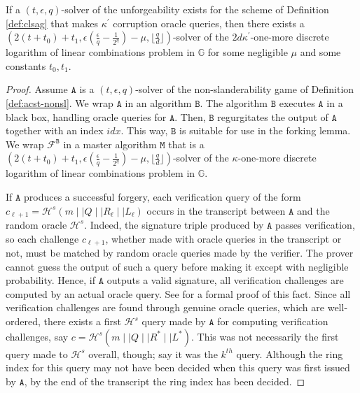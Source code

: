 \documentclass{llncs}
\begin{document}
\begin{theorem} \label{thm:nonsl}
If a $(t, \epsilon, q)$-solver of the unforgeability exists for the scheme of Definition \ref{def:clsag} that makes $\kappa^\prime$ corruption oracle queries, then there exists a $(2(t+t_0) + t_1, \epsilon\left(\frac{\epsilon}{q} - \frac{1}{2^\eta}\right) - \mu, \lfloor \frac{q}{d}\rfloor)$-solver of the $2d\kappa^\prime$-one-more discrete logarithm of linear combinations problem in $\mathbb{G}$ for some negligible $\mu$ and some constants $t_0, t_1$.
\end{theorem}

\begin{proof}
Assume $\texttt{A}$ is a $(t, \epsilon, q)$-solver of the non-slanderability game of Definition \ref{def:acst-nonsl}. We wrap $\texttt{A}$ in an algorithm $\texttt{B}$. The algorithm $\texttt{B}$ executes $\texttt{A}$ in a black box, handling oracle queries for $\texttt{A}$. Then, $\texttt{B}$ regurgitates the output of $\texttt{A}$ together with an index $idx$. This way, $\texttt{B}$ is suitable for use in the forking lemma. We wrap $\mathcal{F}^{\texttt{B}}$ in a master algorithm $\texttt{M}$ that is a $(2(t+t_0) + t_1, \epsilon\left(\frac{\epsilon}{q} - \frac{1}{2^\eta}\right) - \mu, \lfloor \frac{q}{d}\rfloor)$-solver of the $\kappa$-one-more discrete logarithm of linear combinations problem in $\mathbb{G}$.

If $\texttt{A}$ produces a successful forgery, each verification query of the form $c_{\ell+1} = \mathcal{H}^s(m \mid \mid Q \mid \mid R_\ell \mid \mid L_\ell)$ occurs in the transcript between $\texttt{A}$ and the random oracle $\mathcal{H}^s$. Indeed, the signature triple produced by $\texttt{A}$ passes verification, so each challenge $c_{\ell+1}$, whether made with oracle queries in the transcript or not, must be matched by random oracle queries made by the verifier. The prover cannot guess the output of such a query before making it except with negligible probability. Hence, if $\texttt{A}$ outputs a valid signature, all verification challenges are computed by an actual oracle query. See \cite{liu2004linkable} for a formal proof of this fact. Since all verification challenges are found through genuine oracle queries, which are well-ordered, there exists a first $\mathcal{H}^s$ query made by $\texttt{A}$ for computing verification challenges, say $c = \mathcal{H}^s(m \mid \mid Q \mid \mid R^* \mid \mid L^*)$. This was not necessarily the first query made to $\mathcal{H}^s$ overall, though; say it was the $k^{th}$ query. Although the ring index for this query may not have been decided when this query was first issued by $\texttt{A}$, by the end of the transcript the ring index has been decided.


\end{proof}
\end{document}
